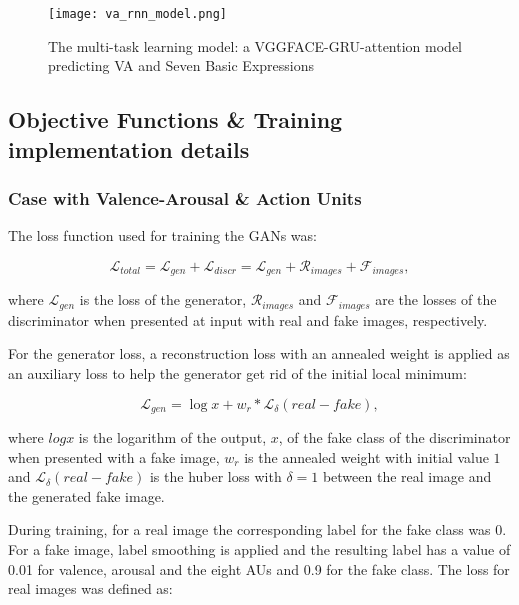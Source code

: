 \documentclass[a4paper, 10pt, conference]{ieeeconf}      %
\begin{document}
\begin{figure}[h]
    \centering
    \texttt{[image: va\_rnn\_model.png]}
    \caption{The multi-task learning model: a VGGFACE-GRU-attention model predicting VA and Seven Basic Expressions}
    \label{va-expr-model}
\end{figure}




\subsection{Objective Functions \& Training implementation details}

\subsubsection{Case with Valence-Arousal \& Action Units}

The loss function used for training the GANs was: 
\vskip -0.5cm

\begin{equation} \label{eq_1}
\mathcal{L}_{total} = \mathcal{L}_{gen} + \mathcal{L}_{discr} = \mathcal{L}_{gen} + \mathcal{R}_{images} + \mathcal{F}_{images},
\end{equation}

\noindent
where $\mathcal{L}_{gen}$ is the loss of the generator, $\mathcal{R}_{images}$ and  $\mathcal{F}_{images}$ are the losses of the discriminator when presented at input with real and fake images, respectively.

For the generator loss, a reconstruction loss with an annealed weight is applied as an auxiliary loss to help the generator get rid of the initial local minimum:

\vskip -0.3cm

\begin{equation} \label{eq_2}
\mathcal{L}_{gen} = \log x + w_{r} * \mathcal{L}_{\delta}(real-fake),
\end{equation}

where $logx$ is the logarithm of the output, $x$, of the fake class of the discriminator when  presented with a fake image, $w_r$ is the annealed weight with initial value $1$ and $\mathcal{L}_{\delta}(real-fake)$ is the huber loss \cite{huber1964robust} with $\delta = 1$ between the real image and the generated fake image.

During training, for a real image the corresponding label for the fake class was 0. For a fake image, label smoothing is applied and the resulting label has a value of 0.01 for valence, arousal and the eight AUs and 0.9 for the fake class. The loss for real images was defined as:
\end{document}
